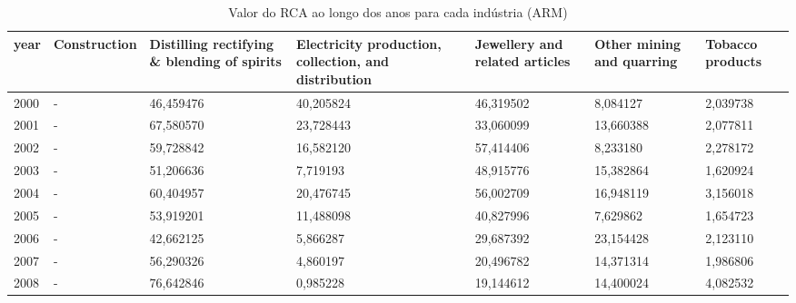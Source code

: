 \begin{table}
\centering
\caption{Valor do RCA ao longo dos anos para cada indústria (ARM)}
\begin{tabular}{p{1cm}p{2cm}p{2cm}p{2cm}p{2cm}p{2cm}p{2cm}}
\toprule
 year &  Construction &  Distilling rectifying \& blending of spirits &  Electricity production, collection, and distribution &  Jewellery and related articles &  Other mining and quarring &  Tobacco products \\
\midrule
 2000 &             - &                                    46,459476 &                                          40,205824 &                       46,319502 &                   8,084127 &          2,039738 \\
 2001 &             - &                                    67,580570 &                                          23,728443 &                       33,060099 &                  13,660388 &          2,077811 \\
 2002 &             - &                                    59,728842 &                                          16,582120 &                       57,414406 &                   8,233180 &          2,278172 \\
 2003 &             - &                                    51,206636 &                                           7,719193 &                       48,915776 &                  15,382864 &          1,620924 \\
 2004 &             - &                                    60,404957 &                                          20,476745 &                       56,002709 &                  16,948119 &          3,156018 \\
 2005 &             - &                                    53,919201 &                                          11,488098 &                       40,827996 &                   7,629862 &          1,654723 \\
 2006 &             - &                                    42,662125 &                                           5,866287 &                       29,687392 &                  23,154428 &          2,123110 \\
 2007 &             - &                                    56,290326 &                                           4,860197 &                       20,496782 &                  14,371314 &          1,986806 \\
 2008 &             - &                                    76,642846 &                                           0,985228 &                       19,144612 &                  14,400024 &          4,082532 \\

\end{tabular}
\end{table}

